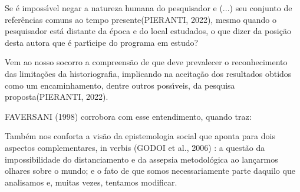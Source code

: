 \documentclass[
12pt,		%
openright,	%
twoside,  %
a4paper,			%
chapter=TITLE,		%
english,			%
french,				%
spanish,			%
brazil				%
]{USPSC-classe/USPSC}
\begin{document}
Se \'e imposs\'{\i}vel \textquotedbl negar a natureza humana do pesquisador e (...) seu conjunto de refer\^encias comuns ao tempo presente\textquotedbl  (PIERANTI, 2022), mesmo quando o pesquisador est\'a \textquotedbl distante da \'epoca e do local estudados\textquotedbl , o que dizer da posi\c{c}\~ao desta autora que \'e part\'{\i}cipe do programa em estudo?









Vem ao nosso socorro a compreens\~ao de que \textquotedbl deve prevalecer o reconhecimento das limita\c{c}\~oes da historiografia, implicando na aceita\c{c}\~ao dos resultados obtidos como um encaminhamento, dentre outros poss\'{\i}veis, da pesquisa proposta\textquotedbl  (PIERANTI, 2022).









 FAVERSANI (1998) corrobora com esse entendimento, quando traz:










\noindent\begin{center}\mbox{\centering{}}\end{center}


Tamb\'em nos conforta a vis\~ao da epistemologia social que aponta para dois aspectos complementares, in verbis  (GODOI et al., 2006) : \textquotedbl a quest\~ao da impossibilidade do distanciamento e da assepsia metodol\'ogica ao lan\c{c}armos olhares sobre o mundo; e o fato de que somos necessariamente parte daquilo que analisamos e, muitas vezes, tentamos modificar\textquotedbl .
\end{document}
